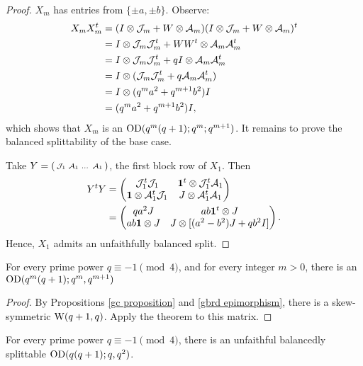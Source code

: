 \documentclass[../../../main]{subfiles}
\begin{document}
\begin{proof}
 $X_m$ has entries from $\{\pm a, \pm b\}$. Observe:
 \begin{align*}
  X_mX_m^t &= (I \otimes \mathcal{J}_m + W \otimes \mathcal{A}_m)(I \otimes \mathcal{J}_m + W \otimes \mathcal{A}_m)^t \\
  &= I \otimes \mathcal{J}_m\mathcal{J}_m^t + WW^t \otimes \mathcal{A}_m\mathcal{A}_m^t \\
  &= I \otimes \mathcal{J}_m\mathcal{J}_m^t + qI \otimes \mathcal{A}_m\mathcal{A}_m^t \\
  &= I \otimes (\mathcal{J}_m\mathcal{J}_m^t + q\mathcal{A}_m\mathcal{A}_m^t) \\
  &= I \otimes (q^ma^2 + q^{m+1}b^2)I \\
  &= (q^ma^2 + q^{m+1}b^2)I,
 \end{align*}
 which shows that $X_m$ is an $\text{OD}(q^m(q+1); q^m; q^{m+1})$. It remains to prove the balanced splittability of the base case.
 
 Take $Y=(\begin{smallmatrix} \mathcal{J}_1 & \mathcal{A}_1 & \dots & \mathcal{A}_1 \end{smallmatrix})$, the first block row of $X_1$. Then
 \begin{align*}
  Y^tY &= \begin{pmatrix} \mathcal{J}_1^t\mathcal{J}_1 & \mathbf{1}^t \otimes \mathcal{J}_1^t\mathcal{A}_1 \\ \mathbf{1} \otimes \mathcal{A}_1^t\mathcal{J}_1 & J \otimes \mathcal{A}_1^t\mathcal{A}_1 \end{pmatrix} \\
  &= \begin{pmatrix} qa^2J & ab\mathbf{1}^t \otimes J \\ ab\mathbf{1} \otimes J & J \otimes [(a^2-b^2)J + qb^2I] \end{pmatrix}.
 \end{align*}
 Hence, $X_1$ admits an unfaithfully balanced split.
\end{proof}

\begin{cor}
 For every prime power $q \equiv -1 \pmod{4}$, and for every integer $m>0$, there is an $\text{OD}(q^m(q+1); q^m, q^{m+1})$
\end{cor}

\begin{proof}
 By Propositions \ref{gc proposition} and \ref{gbrd epimorphism}, there is a skew-symmetric $\text{W}(q+1,q)$. Apply the theorem to this matrix.
\end{proof}

\begin{cor}
 For every prime power $q \equiv -1 \pmod{4}$, there is an unfaithful balancedly splittable $\text{OD}(q(q+1); q, q^2)$. 
\end{cor}
\end{document}
